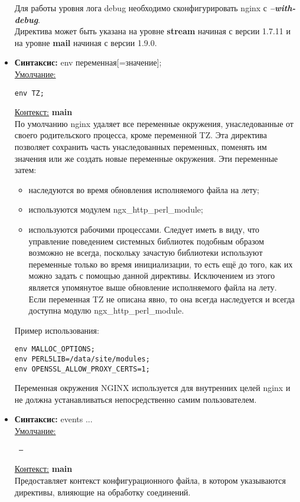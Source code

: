 \documentclass[a4paper,10pt,twoside]{article}
\begin{document}
\begin{itemize}
Для работы уровня лога debug необходимо сконфигурировать nginx с \textbf{\textit{--with-debug}}.\\
Директива может быть указана на уровне \textbf{stream} начиная с версии 1.7.11 и на уровне \textbf{mail} начиная с версии 1.9.0.

\item \textbf{Синтаксис:} env переменная[=значение];\\
\underline{Умолчание:}
\begin{verbatim}
env TZ;
\end{verbatim} 
\underline{Контекст:} \textbf{main}\\
По умолчанию nginx удаляет все переменные окружения, унаследованные от своего родительского процесса, кроме переменной TZ. Эта директива позволяет сохранить часть унаследованных переменных, поменять им значения или же создать новые переменные окружения. Эти переменные затем:
\begin{itemize}
 \item наследуются во время обновления исполняемого файла на лету;
\item используются модулем ngx\_http\_perl\_module;
\item используются рабочими процессами. Следует иметь в виду, что управление поведением системных библиотек подобным образом возможно не всегда, поскольку зачастую библиотеки используют переменные только во время инициализации, то есть ещё до того, как их можно задать с помощью данной директивы. Исключением из этого является упомянутое выше обновление исполняемого файла на лету.\\
Если переменная TZ не описана явно, то она всегда наследуется и всегда доступна модулю ngx\_http\_perl\_module.
\end{itemize}

Пример использования:

\begin{verbatim}
env MALLOC_OPTIONS;
env PERL5LIB=/data/site/modules;
env OPENSSL_ALLOW_PROXY_CERTS=1;
\end{verbatim} 
Переменная окружения NGINX используется для внутренних целей nginx и не должна устанавливаться непосредственно самим пользователем.

\item \textbf{Синтаксис:} events { ... }\\
\underline{Умолчание:}
\begin{verbatim}
 —
\end{verbatim} 
\underline{Контекст:} \textbf{main}\\
Предоставляет контекст конфигурационного файла, в котором указываются директивы, влияющие на обработку соединений.


\end{itemize}
\end{document}
